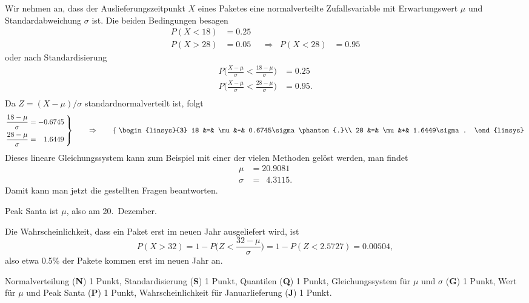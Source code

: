 \begin{loesung}
Wir nehmen an, dass der Auslieferungszeitpunkt $X$ eines Paketes
eine normalverteilte Zufallsvariable mit Erwartungswert $\mu$ und
Standardabweichung $\sigma$ ist.
Die beiden Bedingungen besagen
\[
\begin{aligned}
P(X<18)&=0.25&&            &         &       \\
P(X>28)&=0.05 &&\Rightarrow& P(X<28) &= 0.95
\end{aligned}
\]
oder nach Standardisierung
\[
\begin{aligned}
P\biggl(\frac{X-\mu}{\sigma} < \frac{18-\mu}{\sigma}\biggr) &= 0.25 \\
P\biggl(\frac{X-\mu}{\sigma} < \frac{28-\mu}{\sigma}\biggr) &= 0.95.\\
\end{aligned}
\]
Da $Z=(X-\mu)/\sigma$ standardnormalverteilt ist, folgt
\[
\left.
\begin{aligned}
\frac{18-\mu}{\sigma} &=          - 0.6745 \\
\frac{28-\mu}{\sigma} &= \phantom{-}1.6449 
\end{aligned}
\;
\right\}
\qquad\Rightarrow\qquad
\left\{\;
\begin{linsys}{3}
18 &=& \mu &-& 0.6745\sigma\phantom{.}\\
28 &=& \mu &+& 1.6449\sigma.
\end{linsys}
\right.
\]
Dieses lineare Gleichungssystem kann zum Beispiel mit einer der vielen
Methoden gelöst werden, man findet
\begin{align*}
\mu &= 20.9081 \\
\sigma &= \phantom{0}4.3115.
\end{align*}
Damit kann man jetzt die gestellten Fragen beantworten.
\begin{teilaufgaben}
\item
Peak Santa ist $\mu$, also am 20.~Dezember.
\item
Die Wahrscheinlichkeit, dass ein Paket erst im neuen Jahr ausgeliefert
wird, ist
\[
P(X>32)
=
1-P\biggl(Z<\frac{32-\mu}{\sigma}\biggr)
=
1-P(Z < 2.5727) 
=
0.00504,
\]
also etwa 0.5\% der Pakete kommen erst im neuen Jahr an.
\qedhere
\end{teilaufgaben}
\end{loesung}

\begin{bewertung}
Normalverteilung ({\bf N}) 1 Punkt,
Standardisierung ({\bf S}) 1 Punkt,
Quantilen ({\bf Q}) 1 Punkt,
Gleichungssystem für $\mu$ und $\sigma$ ({\bf G}) 1 Punkt,
Wert für $\mu$ und Peak Santa ({\bf P}) 1 Punkt,
Wahrscheinlichkeit für Januarlieferung ({\bf J}) 1 Punkt.
\end{bewertung}

